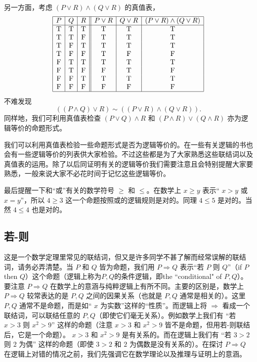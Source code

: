 另一方面，考虑 \((P\lor R)\land (Q\lor R)\) 的真值表，
\[
\begin{array}{|c|c|c||c|c|c|}
\hline
P & Q & R & P\lor R & Q\lor R & (P\lor R)\land (Q\lor R) \\
\hline
\mathrm{T} & \mathrm{T} & \mathrm{T} & \mathrm{T} & \mathrm{T} & \mathrm{T} \\
\mathrm{T} & \mathrm{T} & \mathrm{F} & \mathrm{T} & \mathrm{T} & \mathrm{T} \\
\mathrm{T} & \mathrm{F} & \mathrm{T} & \mathrm{T} & \mathrm{T} & \mathrm{T} \\
\mathrm{T} & \mathrm{F} & \mathrm{F} & \mathrm{T} & \mathrm{F} & \mathrm{F} \\
\mathrm{F} & \mathrm{T} & \mathrm{T} & \mathrm{T} & \mathrm{T} & \mathrm{T} \\
\mathrm{F} & \mathrm{T} & \mathrm{F} & \mathrm{F} & \mathrm{T} & \mathrm{F} \\
\mathrm{F} & \mathrm{F} & \mathrm{T} & \mathrm{T} & \mathrm{T} & \mathrm{T} \\
\mathrm{F} & \mathrm{F} & \mathrm{F} & \mathrm{F} & \mathrm{F} & \mathrm{F} \\
\hline
\end{array}
\]
不难发现
\[
((P\land Q)\lor R)\sim ((P\lor R)\land (Q\lor R)).
\]
同样地，我们可利用真值表检查 \((P\lor Q)\land R\) 和 \((P\land R)\lor (Q\land R)\) 亦为逻辑等价的命题形式。

我们可以利用真值表检验一些命题形式是否为逻辑等价的。在一些有关逻辑的书也会有一些逻辑等价的列表供大家检验。不过这些都是为了大家熟悉这些联结词以及真值表的运用。除了以后同证明有关的逻辑等价我们需要注意且会特别提醒大家要熟悉，一般来说大家不必花时间于记忆这些逻辑等价。

最后提醒一下和“或”有关的数学符号 \(\ge\) 和 \(\le\)。在数学上 \(x\ge y\) 表示“ \(x > y\) 或 \(x = y\)”，所以 \(4\ge 3\) 这一个命题按照或的逻辑规则是对的。同理 \(4\le 5\) 是对的。当然 \(4\le 4\) 也是对的。

\subsection{若-则}
这是一个数学定理里常见的联结词，但又是许多同学不甚了解而经常误解的联结词，请务必弄清楚。当 \(P\) 和 \(Q\) 皆为命题，我们用 \(P\Rightarrow Q\) 表示“若 \(P\) 则 \(Q\)”（if \(P\) then \(Q\)）这个命题（逻辑上称为\(P,Q\)的条件逻辑，即the ``conditional" of \(P,Q\)）。要注意 \(P\Rightarrow Q\) 在数学上的意涵与纯粹逻辑上有所不同。主要的区别是，数学上 \(P\Rightarrow Q\) 较常表达的是 \(P,Q\) 之间的因果关系（也就是 \(P,Q\) 通常是相关的）。这里 \(P,Q\) 通常不是命题，而是如“ \(x\) 为实数”这样的“性质”。而逻辑上将 \(\Rightarrow\) 看成一个联结词，可以联结任意的 \(P,Q\)（即使它们毫无关系）。例如数学上我们有 “若 \(x > 3\) 则 \(x^{2} > 9\)” 这样的命题（注意 \(x > 3\) 和 \(x^{2} > 9\) 皆不是命题，但用若-则联结后，它是一个命题）。 \(x > 3\) 和 \(x^{2} > 9\) 是有关系的。而在逻辑上我们有 “若 \(3 > 2\) 则 $2$ 为偶” 这样的命题（即使 \(3>2\) 和 $2$ 为偶数是没有关系的）。在探讨 \(P\Rightarrow Q\) 在逻辑上对错的情况之前，我们先强调它在数学理论以及推理与证明上的意涵。

